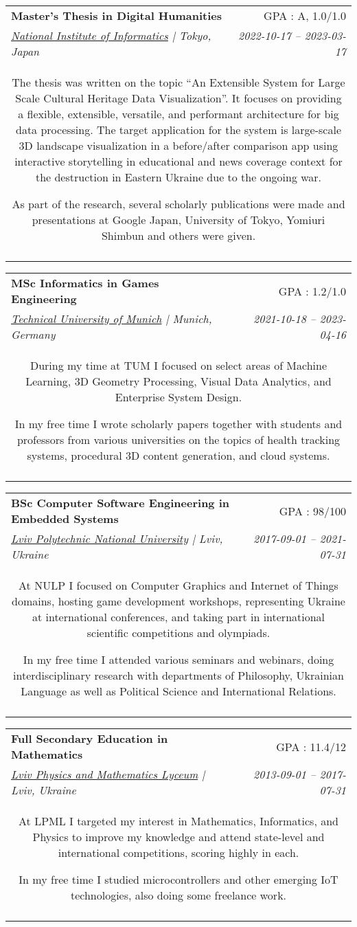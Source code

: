 \documentclass[letterpaper,10pt]{article}
\makeatletter
\newcommand{\resumeSubheading}[5]{
  \item
    \begin{tabular*}{0.97\textwidth}[t]{l@{\extracolsep{\fill}}r}
      \textbf{#1} & #2 \\
      \textit{#3} & \textit{#4} \\
      \multicolumn{2}{c}{\parbox{\linewidth}{#5}} \\\vspace{-2pt}
    \end{tabular*}\vspace{-8pt}
}
\makeatother
\begin{document}
    \resumeSubheading
      {Master's Thesis in Digital Humanities}{GPA : A, 1.0/1.0}
      {\href{https://www.nii.ac.jp/}{{National Institute of Informatics}} | Tokyo, Japan}{2022-10-17 -- 2023-03-17} 
      {The thesis was written on the topic “An Extensible System for Large Scale Cultural Heritage Data Visualization”. It focuses on providing a flexible, extensible, versatile, and performant architecture for big data processing. The target application for the system is large-scale 3D landscape visualization in a before/after comparison app using interactive storytelling in educational and news coverage context for the destruction in Eastern Ukraine due to the ongoing war.

As part of the research, several scholarly publications were made and presentations at Google Japan, University of Tokyo, Yomiuri Shimbun and others were given.}
		
    \resumeSubheading
      {MSc Informatics in Games Engineering}{GPA : 1.2/1.0}
      {\href{https://www.tum.de/}{{Technical University of Munich}} | Munich, Germany}{2021-10-18 -- 2023-04-16} 
      {During my time at TUM I focused on select areas of Machine Learning, 3D Geometry Processing, Visual Data Analytics, and Enterprise System Design.

In my free time I wrote scholarly papers together with students and professors from various universities on the topics of health tracking systems, procedural 3D content generation, and cloud systems.}
		
    \resumeSubheading
      {BSc Computer Software Engineering in Embedded Systems}{GPA : 98/100}
      {\href{https://lpnu.ua/}{{Lviv Polytechnic National University}} | Lviv, Ukraine}{2017-09-01 -- 2021-07-31} 
      {At NULP I focused on Computer Graphics and Internet of Things domains, hosting game development workshops, representing Ukraine at international conferences, and taking part in international scientific competitions and olympiads.

In my free time I attended various seminars and webinars, doing interdisciplinary research with departments of Philosophy, Ukrainian Language as well as Political Science and International Relations.}
		
    \resumeSubheading
      {Full Secondary Education in Mathematics}{GPA : 11.4/12}
      {\href{https://www.lpml.com.ua/}{{Lviv Physics and Mathematics Lyceum}} | Lviv, Ukraine}{2013-09-01 -- 2017-07-31} 
      {At LPML I targeted my interest in Mathematics, Informatics, and Physics to improve my knowledge and attend state-level and international competitions, scoring highly in each.

In my free time I studied microcontrollers and other emerging IoT technologies, also doing some freelance work.}
		
\end{document}

